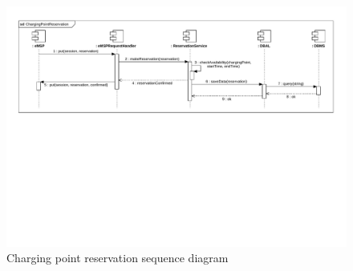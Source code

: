 \begin{figure}
    \centering
    \includegraphics[trim={0 10cm 0 0},clip, width=1\textwidth]{Images/cp2/runtime/Booking_cpms_view.pdf}
    \caption{Charging point reservation sequence diagram}
\end{figure}


